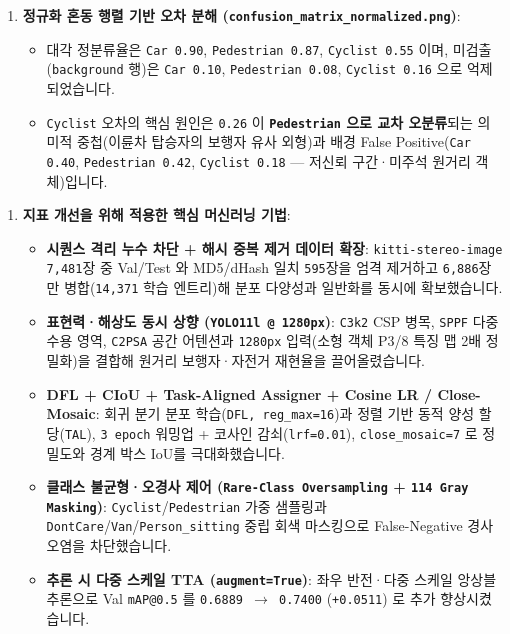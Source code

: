\documentclass[10.5pt,a4paper]{article}
\begin{document}
\begin{enumerate}[leftmargin=1.8em,itemsep=2pt]
\item \textbf{정규화 혼동 행렬 기반 오차 분해 (\texttt{confusion\_\allowbreak{}matrix\_\allowbreak{}normalized.\allowbreak{}png})}:
\begin{itemize}[leftmargin=1.5em,itemsep=2pt]
\item 대각 정분류율은 \texttt{Car 0.\allowbreak{}90}, \texttt{Pedestrian 0.\allowbreak{}87}, \texttt{Cyclist 0.\allowbreak{}55} 이며, 미검출(\texttt{background} 행)은 \texttt{Car 0.\allowbreak{}10}, \texttt{Pedestrian 0.\allowbreak{}08}, \texttt{Cyclist 0.\allowbreak{}16} 으로 억제되었습니다.
\item \texttt{Cyclist} 오차의 핵심 원인은 \texttt{0.\allowbreak{}26} 이 \textbf{\texttt{Pedestrian} 으로 교차 오분류}되는 의미적 중첩(이륜차 탑승자의 보행자 유사 외형)과 배경 False Positive(\texttt{Car 0.\allowbreak{}40}, \texttt{Pedestrian 0.\allowbreak{}42}, \texttt{Cyclist 0.\allowbreak{}18} --- 저신뢰 구간·미주석 원거리 객체)입니다.
\end{itemize}
\end{enumerate}

\begin{enumerate}[leftmargin=1.8em,itemsep=2pt]
\item \textbf{지표 개선을 위해 적용한 핵심 머신러닝 기법}:
\begin{itemize}[leftmargin=1.5em,itemsep=2pt]
\item \textbf{시퀀스 격리 누수 차단 + 해시 중복 제거 데이터 확장}: \texttt{kitti-\allowbreak{}stereo-\allowbreak{}image} \texttt{7,\allowbreak{}481}장 중 Val/Test 와 MD5/dHash 일치 \texttt{595}장을 엄격 제거하고 \texttt{6,\allowbreak{}886}장만 병합(\texttt{14,\allowbreak{}371} 학습 엔트리)해 분포 다양성과 일반화를 동시에 확보했습니다.
\item \textbf{표현력·해상도 동시 상향 (\texttt{YOLO11l @ 1280px})}: \texttt{C3k2} CSP 병목, \texttt{SPPF} 다중 수용 영역, \texttt{C2PSA} 공간 어텐션과 \texttt{1280px} 입력(소형 객체 P3/8 특징 맵 2배 정밀화)을 결합해 원거리 보행자·자전거 재현율을 끌어올렸습니다.
\item \textbf{DFL + CIoU + Task-Aligned Assigner + Cosine LR / Close-Mosaic}: 회귀 분기 분포 학습(\texttt{DFL,\allowbreak{} reg\_\allowbreak{}max=16})과 정렬 기반 동적 양성 할당(\texttt{TAL}), \texttt{3 epoch} 워밍업 + 코사인 감쇠(\texttt{lrf=0.\allowbreak{}01}), \texttt{close\_\allowbreak{}mosaic=7} 로 정밀도와 경계 박스 IoU를 극대화했습니다.
\item \textbf{클래스 불균형·오경사 제어 (\texttt{Rare-\allowbreak{}Class Oversampling} + \texttt{114 Gray Masking})}: \texttt{Cyclist}/\texttt{Pedestrian} 가중 샘플링과 \texttt{DontCare}/\texttt{Van}/\texttt{Person\_\allowbreak{}sitting} 중립 회색 마스킹으로 False-Negative 경사 오염을 차단했습니다.
\item \textbf{추론 시 다중 스케일 TTA (\texttt{augment=True})}: 좌우 반전·다중 스케일 앙상블 추론으로 Val \texttt{mAP@0.\allowbreak{}5} 를 \texttt{0.\allowbreak{}6889 $\rightarrow$ 0.\allowbreak{}7400} (\texttt{+0.\allowbreak{}0511}) 로 추가 향상시켰습니다.
\end{itemize}
\end{enumerate}
\end{document}

